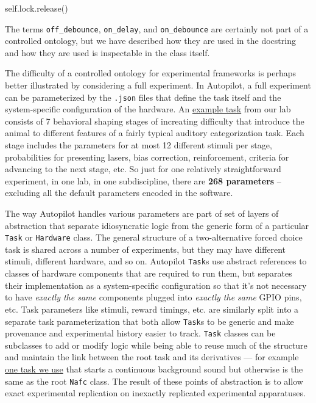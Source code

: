 \documentclass[10pt]{article}
\newenvironment{Shaded}{}{}
\newcommand{\NormalTok}[1]{#1}
\newcommand{\VariableTok}[1]{\textcolor[rgb]{0.10,0.09,0.49}{#1}}
\begin{document}
\begin{multicols}{2}
\begin{Shaded}
\begin{Highlighting}[]
    \VariableTok{self}\NormalTok{.lock.release()}
\end{Highlighting}
\end{Shaded}

The terms \texttt{off\_debounce}, \texttt{on\_delay}, and
\texttt{on\_debounce} are certainly not part of a controlled ontology,
but we have described how they are used in the docstring and how they
are used is inspectable in the class itself.

The difficulty of a controlled ontology for experimental frameworks is
perhaps better illustrated by considering a full experiment. In
Autopilot, a full experiment can be parameterized by the \texttt{.json}
files that define the task itself and the system-specific configuration
of the hardware. An
\href{https://gist.github.com/sneakers-the-rat/eebe675326a157df49f66f62c4e33a6e}{example
task} from our lab consists of 7 behavioral shaping stages of increating
difficulty that introduce the animal to different features of a fairly
typical auditory categorization task. Each stage includes the parameters
for at most 12 different stimuli per stage, probabilities for presenting
lasers, bias correction, reinforcement, criteria for advancing to the
next stage, etc. So just for one relatively straightforward experiment,
in one lab, in one subdiscipline, there are \textbf{268 parameters} --
excluding all the default parameters encoded in the software.

The way Autopilot handles various parameters are part of set of layers
of abstraction that separate idiosyncratic logic from the generic form
of a particular \texttt{Task} or \texttt{Hardware} class. The general
structure of a two-alternative forced choice task is shared across a
number of experiments, but they may have different stimuli, different
hardware, and so on. Autopilot \texttt{Task}s use abstract references to
classes of hardware components that are required to run them, but
separates their implementation as a system-specific configuration so
that it's not necessary to have \emph{exactly the same} components
plugged into \emph{exactly the same} GPIO pins, etc. Task parameters
like stimuli, reward timings, etc. are similarly split into a separate
task parameterization that both allow \texttt{Task}s to be generic and
make provenance and experimental history easier to track. \texttt{Task}
classes can be subclasses to add or modify logic while being able to
reuse much of the structure and maintain the link between the root task
and its derivatives --- for example
\href{https://github.com/auto-pi-lot/autopilot-plugin-wehrlab/blob/9cfffcf5fe1886d25658d4f1f0c0ffe41c18e2cc/gap/nafc_gap.py\#L13-L49}{one
task we use} that starts a continuous background sound but otherwise is
the same as the root \texttt{Nafc} class. The result of these points of
abstraction is to allow exact experimental replication on inexactly
replicated experimental apparatuses.


\end{multicols}
\end{document}
